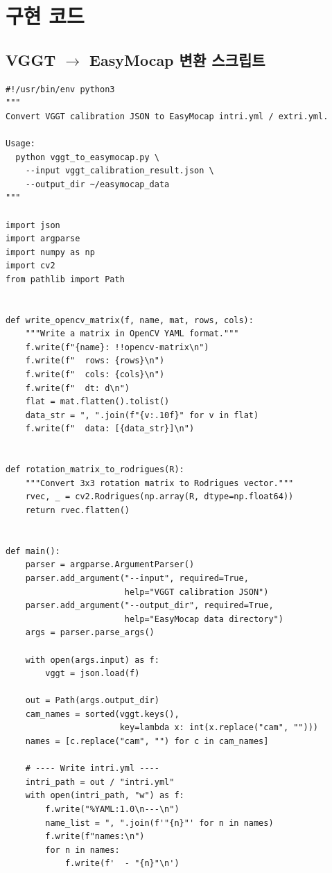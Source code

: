 \documentclass[11pt, a4paper]{report}
\begin{document}
\chapter{구현 코드}

\section{VGGT $\rightarrow$ EasyMocap 변환 스크립트}

\begin{lstlisting}[caption={vggt\_to\_easymocap.py --- VGGT 결과를 EasyMocap intri.yml/extri.yml로 변환}, label=lst:converter]
#!/usr/bin/env python3
"""
Convert VGGT calibration JSON to EasyMocap intri.yml / extri.yml.

Usage:
  python vggt_to_easymocap.py \
    --input vggt_calibration_result.json \
    --output_dir ~/easymocap_data
"""

import json
import argparse
import numpy as np
import cv2
from pathlib import Path


def write_opencv_matrix(f, name, mat, rows, cols):
    """Write a matrix in OpenCV YAML format."""
    f.write(f"{name}: !!opencv-matrix\n")
    f.write(f"  rows: {rows}\n")
    f.write(f"  cols: {cols}\n")
    f.write(f"  dt: d\n")
    flat = mat.flatten().tolist()
    data_str = ", ".join(f"{v:.10f}" for v in flat)
    f.write(f"  data: [{data_str}]\n")


def rotation_matrix_to_rodrigues(R):
    """Convert 3x3 rotation matrix to Rodrigues vector."""
    rvec, _ = cv2.Rodrigues(np.array(R, dtype=np.float64))
    return rvec.flatten()


def main():
    parser = argparse.ArgumentParser()
    parser.add_argument("--input", required=True,
                        help="VGGT calibration JSON")
    parser.add_argument("--output_dir", required=True,
                        help="EasyMocap data directory")
    args = parser.parse_args()

    with open(args.input) as f:
        vggt = json.load(f)

    out = Path(args.output_dir)
    cam_names = sorted(vggt.keys(),
                       key=lambda x: int(x.replace("cam", "")))
    names = [c.replace("cam", "") for c in cam_names]

    # ---- Write intri.yml ----
    intri_path = out / "intri.yml"
    with open(intri_path, "w") as f:
        f.write("%YAML:1.0\n---\n")
        name_list = ", ".join(f'"{n}"' for n in names)
        f.write(f"names:\n")
        for n in names:
            f.write(f'  - "{n}"\n')


\end{lstlisting}
\end{document}
